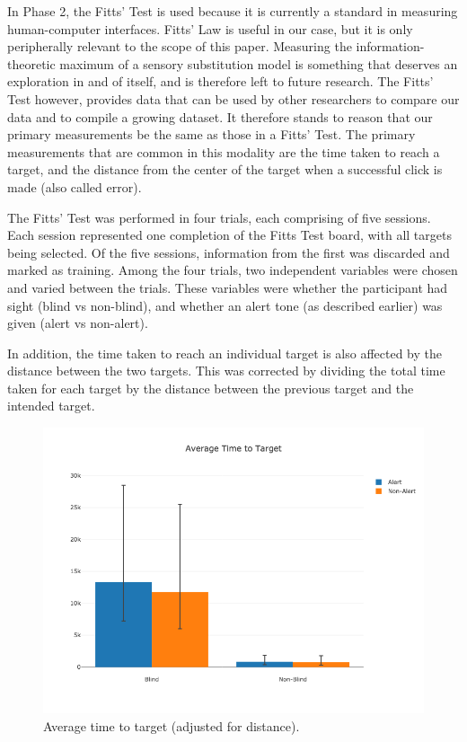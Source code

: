 \documentclass[
hidelinks,
12pt, %
oneside, %
english, %
doublespacing, %
headsepline, %
]{MastersDoctoralThesis} %
\begin{document}
In Phase 2, the Fitts' Test is used because it is currently a standard in measuring human-computer interfaces. Fitts' Law is useful in our case, but it is only peripherally relevant to the scope of this paper. Measuring the information-theoretic maximum of a sensory substitution model is something that deserves an exploration in and of itself, and is therefore left to future research. The Fitts' Test however, provides data that can be used by other researchers to compare our data and to compile a growing dataset. It therefore stands to reason that our primary measurements be the same as those in a Fitts' Test. The primary measurements that are common in this modality \parencite{mackenzie_extending_1992} \parencite{chun_evaluating_2004} are the time taken to reach a target, and the distance from the center of the target when a successful click is made (also called error).

The Fitts' Test was performed in four trials, each comprising of five sessions. Each session represented one completion of the Fitts Test board, with all targets being selected. Of the five sessions, information from the first was discarded and marked as training. Among the four trials, two independent variables were chosen and varied between the trials. These variables were whether the participant had sight (blind vs non-blind), and whether an alert tone (as described earlier) was given (alert vs non-alert).

In addition, the time taken to reach an individual target is also affected by the distance between the two targets. This was corrected by dividing the total time taken for each target by the distance between the previous target and the intended target.

\begin{figure}[h]
	\centering\includegraphics[width=1\linewidth]{images/timetotarget}
	\decoRule
	\caption[Phase 2 Time to Target]{Average time to target (adjusted for distance).}
	\label{fig:p2time}
\end{figure}
\end{document}
